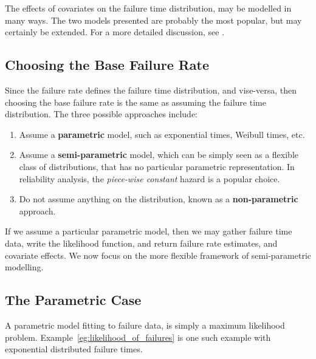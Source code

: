 




\begin{extra}
The effects of covariates on the failure time distribution, may be modelled in many ways. 
The two models presented are probably the most popular, but may certainly be extended. 
For a more detailed discussion, see \cite{cox_analysis_1984}.
\end{extra}





\subsection{Choosing the Base Failure Rate}
Since the failure rate defines the failure time distribution, and vise-versa, then choosing the base failure rate is the same as assuming the failure time distribution.
The three possible approaches include:
\begin{enumerate}
\item Assume a \textbf{parametric} model, such as exponential times, Weibull times, etc.
\item Assume a \textbf{semi-parametric} model, which can be simply seen as a flexible class of distributions, that has no particular parametric representation. In reliability analysis, the \emph{piece-wise constant} hazard is a popular choice.
\item Do not assume anything on the distribution, known as a \textbf{non-parametric} approach. 
\end{enumerate}
If we assume a particular parametric model, then we may gather failure time data, write the likelihood function, and return failure rate estimates, and covariate effects.
We now focus on the more flexible framework of semi-parametric modelling.


\subsection{The Parametric Case}
A parametric model fitting to failure data, is simply a maximum likelihood problem.
Example~\ref{eg:likelihood_of_failures} is one such example with exponential distributed failure times. 





